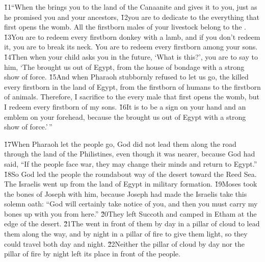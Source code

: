 \v{11}``When the  brings you to the land of the Canaanite and gives it to you, just as he promised you and your ancestors, \v{12}you are to dedicate to the  everything that first opens the womb. All the firstborn males of your livestock belong to the . \v{13}You are to redeem every firstborn donkey with a lamb, and if you don't redeem it, you are to break its neck. You are to redeem every firstborn among your sons. \v{14}Then when your child asks you in the future, `What is this?', you are to say to him, `The  brought us out of Egypt, from the house of bondage with a strong show of force. \v{15}And when Pharaoh stubbornly refused to let us go, the  killed every firstborn in the land of Egypt, from the firstborn of humans to the firstborn of animals. Therefore, I sacrifice to the  every male that first opens the womb, but I redeem every firstborn of my sons. \v{16}It is to be a sign on your hand and an emblem on your forehead, because the  brought us out of Egypt with a strong show of force.'\,''

\v{17}When Pharaoh let the people go, God did not lead them along the road through the land of the Philistines, even though it was nearer, because God had said, ``If the people face war, they may change their minds and return to Egypt.'' \v{18}So God led the people the roundabout way of the desert toward the Reed Sea. The Israelis went up from the land of Egypt in military formation. \v{19}Moses took the bones of Joseph with him, because Joseph had made the Israelis take this solemn oath: ``God will certainly take notice of you, and then you must carry my bones up with you from here.'' \v{20}They left Succoth and camped in Etham at the edge of the desert. \v{21}The  went in front of them by day in a pillar of cloud to lead them along the way, and by night in a pillar of fire to give them light, so they could travel both day and night. \v{22}Neither the pillar of cloud by day nor the pillar of fire by night left its place in front of the people.

